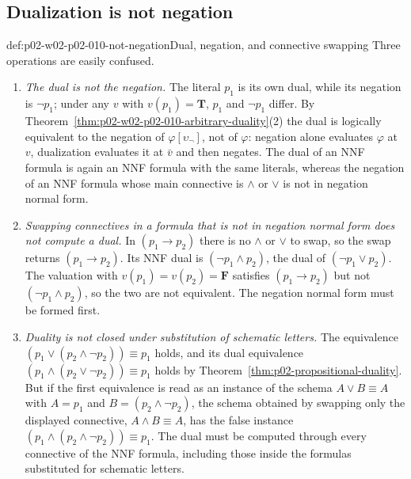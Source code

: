 \subsection{Dualization is not negation}
\label{sec:p02-w02-p02-010-not-negation}

\begin{hbwarning}{def:p02-w02-p02-010-not-negation}{Dual, negation, and connective swapping}
Three operations are easily confused.
\begin{enumerate}
  \item \emph{The dual is not the negation.}  The literal \(p_1\) is its own
        dual, while its negation is \(\neg p_1\); under any \(v\) with
        \(v(p_1)=\mathbf T\), \(p_1\) and \(\neg p_1\) differ.  By
        Theorem~\ref{thm:p02-w02-p02-010-arbitrary-duality}(2) the dual is
        logically equivalent to the negation of
        \(\varphi[\upsilon_{\neg}]\), not of \(\varphi\): negation alone
        evaluates \(\varphi\) at \(v\), dualization evaluates it at \(\bar v\)
        and then negates.  The dual of an NNF formula is again an NNF formula
        with the same literals, whereas the negation of an NNF formula whose
        main connective is \(\land\) or \(\lor\) is not in negation normal
        form.
  \item \emph{Swapping connectives in a formula that is not in negation normal
        form does not compute a dual.}  In \((p_1\to p_2)\) there is no
        \(\land\) or \(\lor\) to swap, so the swap returns \((p_1\to p_2)\).
        Its NNF dual is \((\neg p_1\land p_2)\), the dual of
        \((\neg p_1\lor p_2)\).  The valuation with
        \(v(p_1)=v(p_2)=\mathbf F\) satisfies \((p_1\to p_2)\) but not
        \((\neg p_1\land p_2)\), so the two are not equivalent.  The negation
        normal form must be formed first.
  \item \emph{Duality is not closed under substitution of schematic letters.}
        The equivalence \((p_1\lor(p_2\land\neg p_2))\equiv p_1\) holds, and
        its dual equivalence \((p_1\land(p_2\lor\neg p_2))\equiv p_1\) holds by
        Theorem~\ref{thm:p02-propositional-duality}.  But if the first
        equivalence is read as an instance of the schema
        \(A\lor B\equiv A\) with \(A=p_1\) and \(B=(p_2\land\neg p_2)\), the
        schema obtained by swapping only the displayed connective,
        \(A\land B\equiv A\), has the false instance
        \((p_1\land(p_2\land\neg p_2))\equiv p_1\).  The dual must be computed
        through every connective of the NNF formula, including those inside
        the formulas substituted for schematic letters.
\end{enumerate}
\end{hbwarning}

